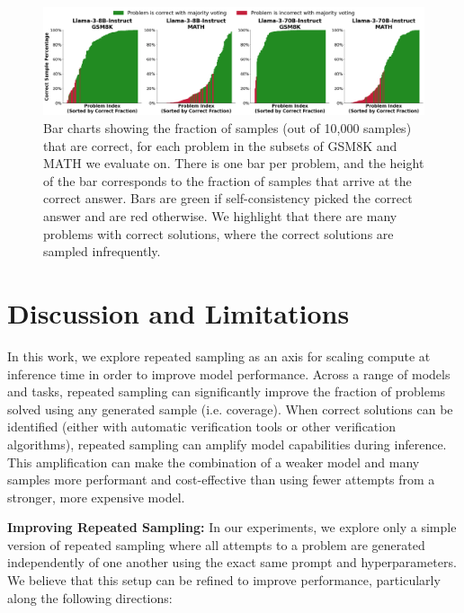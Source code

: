 \documentclass[11pt]{article}
\begin{document}
\begin{figure}
    \centering
    \includegraphics[width=\textwidth]{figures/hist2.png}
    \caption{Bar charts showing the fraction of samples (out of 10,000 samples) that are correct, for each problem in the subsets of GSM8K and MATH we evaluate on. There is one bar per problem, and the height of the bar corresponds to the fraction of samples that arrive at the
    correct answer. Bars are green if self-consistency picked the correct answer and are red otherwise. 
    We highlight that there are many problems with correct solutions, where the correct solutions are sampled infrequently.}
    \label{fig:correct_distribution}
\end{figure}

\section{Discussion and Limitations}
\label{sec:discussion}

In this work, we explore repeated sampling as an axis for scaling compute at inference time in order to improve model performance. Across a range of models and tasks, repeated sampling can significantly improve the fraction of problems solved using any generated sample (i.e. coverage). When correct solutions can be identified (either with automatic verification tools or other verification algorithms), repeated sampling can amplify model capabilities during inference. This amplification can make the combination of a weaker model and many samples more performant and cost-effective than using fewer attempts from a stronger, more expensive model.

\;

\noindent \textbf{Improving Repeated Sampling:} In our experiments, we explore only a simple version of repeated sampling where all attempts to a problem are generated independently of one another using the exact same prompt and hyperparameters. We believe that this setup can be refined to improve performance, particularly along the following directions: 
\end{document}
